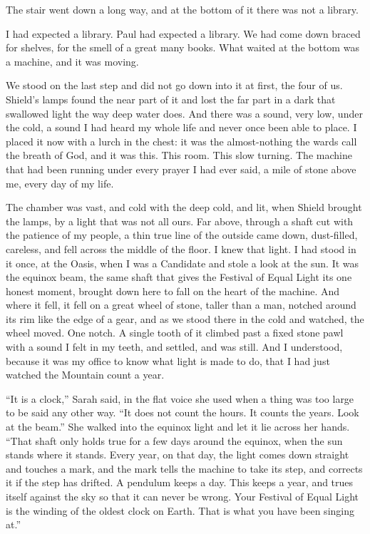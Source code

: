 
The stair went down a long way, and at the bottom of it there was not a library.\par

I had expected a library. Paul had expected a library. We had come down braced for shelves, for the smell of a great many books. What waited at the bottom was a machine, and it was moving.\par

We stood on the last step and did not go down into it at first, the four of us. Shield's lamps found the near part of it and lost the far part in a dark that swallowed light the way deep water does. And there was a sound, very low, under the cold, a sound I had heard my whole life and never once been able to place. I placed it now with a lurch in the chest: it was the almost-nothing the wards call the breath of God, and it was this. This room. This slow turning. The machine that had been running under every prayer I had ever said, a mile of stone above me, every day of my life.\par

The chamber was vast, and cold with the deep cold, and lit, when Shield brought the lamps, by a light that was not all ours. Far above, through a shaft cut with the patience of my people, a thin true line of the outside came down, dust-filled, careless, and fell across the middle of the floor. I knew that light. I had stood in it once, at the Oasis, when I was a Candidate and stole a look at the sun. It was the equinox beam, the same shaft that gives the Festival of Equal Light its one honest moment, brought down here to fall on the heart of the machine. And where it fell, it fell on a great wheel of stone, taller than a man, notched around its rim like the edge of a gear, and as we stood there in the cold and watched, the wheel moved. One notch. A single tooth of it climbed past a fixed stone pawl with a sound I felt in my teeth, and settled, and was still. And I understood, because it was my office to know what light is made to do, that I had just watched the Mountain count a year.\par

\ornament

``It is a clock,'' Sarah said, in the flat voice she used when a thing was too large to be said any other way. ``It does not count the hours. It counts the years. Look at the beam.'' She walked into the equinox light and let it lie across her hands. ``That shaft only holds true for a few days around the equinox, when the sun stands where it stands. Every year, on that day, the light comes down straight and touches a mark, and the mark tells the machine to take its step, and corrects it if the step has drifted. A pendulum keeps a day. This keeps a year, and trues itself against the sky so that it can never be wrong. Your Festival of Equal Light is the winding of the oldest clock on Earth. That is what you have been singing at.''\par

